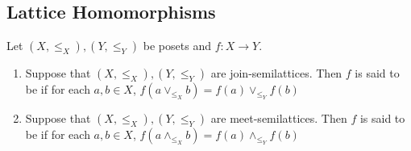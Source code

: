 \documentclass{book}
\begin{document}
	
	
	
	
	
	
	
	
	
	
	
	
	
	
	
	
	
	
	
	
	
	
	
	
	
	
	
	
	
	
	
	
	
	
	
	
	
	
	
	
	
	
	
	
	
	
	
	
	
	
	
	
	
	
	
	
	
	
	
	
	
	
	
	
	
	
	
	
	
	
	
	
	
	
	
	
	
	
	
	
	
	
	
	
	
	
	
	
	
	
	\subsection{Lattice Homomorphisms}
	
	\begin{defn}
		Let $(X, \leq_X), (Y, \leq_Y)$ be posets and $f:X \rightarrow Y$. 
		\begin{enumerate}
			\item Suppose that $(X, \leq_X), (Y, \leq_Y)$ are join-semilattices. Then $f$ is said to be  if for each $a,b \in X$, $f(a \vee_{\leq_X} b) = f(a) \vee_{\leq_Y} f(b)$
			\item Suppose that $(X, \leq_X), (Y, \leq_Y)$ are meet-semilattices. Then $f$ is said to be  if for each $a,b \in X$, $f(a \wedge_{\leq_X} b) = f(a) \wedge_{\leq_Y} f(b)$
		\end{enumerate}
	\end{defn}
	
\end{document}
